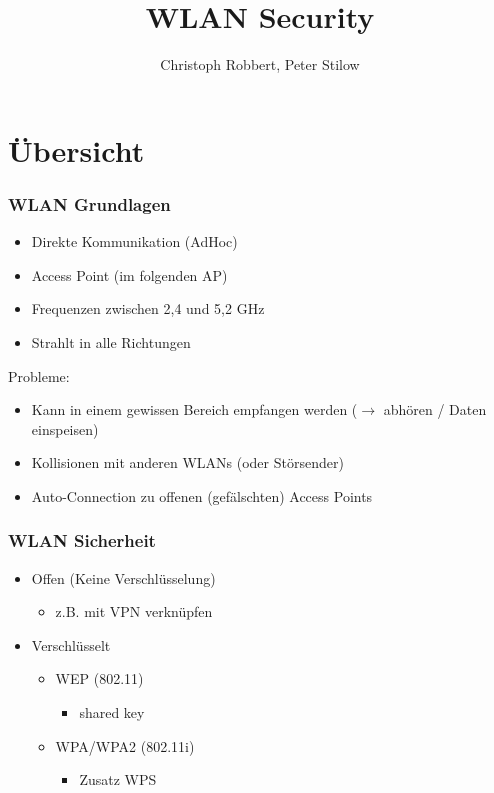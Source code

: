 \documentclass{beamer}
\author[C.Robbert, P. Stilow]{Christoph Robbert, Peter Stilow}
\institute[Uni Paderborn]{Universität Paderborn}
\title[WLAN Security]{WLAN Security}
\begin{document}
\begin{frame}
\maketitle
\end{frame}

\section{Übersicht}
\begin{frame}
\frametitle{WLAN Grundlagen}
\begin{itemize}
	\item Direkte Kommunikation (AdHoc)
	\item Access Point (im folgenden AP)
	\item Frequenzen zwischen 2,4 und 5,2 GHz
	\item Strahlt in alle Richtungen
\end{itemize}
Probleme:
\begin{itemize}
	\item Kann in einem gewissen Bereich empfangen werden ($\rightarrow$ abhören / Daten einspeisen)
	\item Kollisionen mit anderen WLANs (oder Störsender)
	\item Auto-Connection zu offenen (gefälschten) Access Points
\end{itemize}
\end{frame}

\begin{frame}
\frametitle{WLAN Sicherheit}
\begin{itemize}
	\item Offen (Keine Verschlüsselung)
	\begin{itemize}
		\item z.B. mit VPN verknüpfen
	\end{itemize}
	\item Verschlüsselt
	\begin{itemize}
		\item WEP (802.11)
		\begin{itemize}
			\item shared key
		\end{itemize}
		\item WPA/WPA2 (802.11i)
		\begin{itemize}
			\item Zusatz WPS
		\end{itemize}
	\end{itemize}
\end{itemize}
\end{frame}
\end{document}
